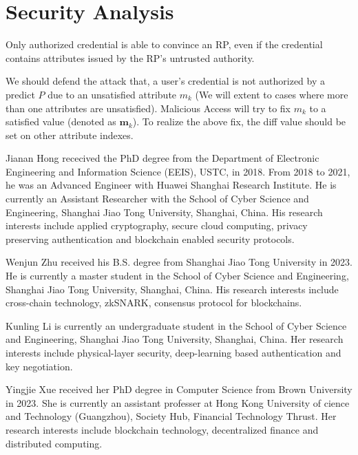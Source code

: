 \documentclass[journal]{IEEEtran}
\begin{document}
\section{Security Analysis}
Only authorized credential is able to convince an RP, even if the credential contains attributes issued by the RP's untrusted authority. 

We should defend the attack that, a user's credential is not authorized by a predict $P$ due to an unsatisfied attribute $m_k$ (We will extent to cases where more than one attributes are unsatisfied). Malicious Access will try to fix $m_k$ to a satisfied value (denoted as $\mathbf{m}_k$). To realize the above fix, the diff value should be set on other attribute indexes.

\balance


\begin{IEEEbiography}
{Jianan Hong}
rececived the PhD degree from the Department of Electronic Engineering and Information Science (EEIS), USTC, in 2018. From 2018 to 2021, he was an Advanced Engineer with Huawei Shanghai Research Institute. He is currently an Assistant Researcher with the School of Cyber Science and Engineering, Shanghai Jiao Tong University, Shanghai, China. His research interests include applied cryptography, secure cloud computing, privacy preserving authentication and blockchain enabled security protocols.
\end{IEEEbiography}

\begin{IEEEbiography}{Wenjun Zhu}
	received his B.S. degree from Shanghai Jiao Tong University in 2023. He is currently a master student in the School of Cyber Science and Engineering, Shanghai Jiao Tong University, Shanghai, China. His research interests include cross-chain technology, zkSNARK, consensus protocol for blockchains.
\end{IEEEbiography}

\begin{IEEEbiography}{Kunling Li}
	is currently an undergraduate student in the School of Cyber Science and Engineering, Shanghai Jiao Tong University, Shanghai, China.
	Her research interests include physical-layer security, deep-learning based authentication and key negotiation.
\end{IEEEbiography}

\begin{IEEEbiography}{Yingjie Xue}
	received her PhD degree in Computer Science from Brown University in 2023. She is currently an assistant professer at Hong Kong University of cience and Technology (Guangzhou), Society Hub, Financial Technology Thrust. Her research interests include blockchain technology, decentralized finance and distributed computing.
\end{IEEEbiography}
\end{document}
